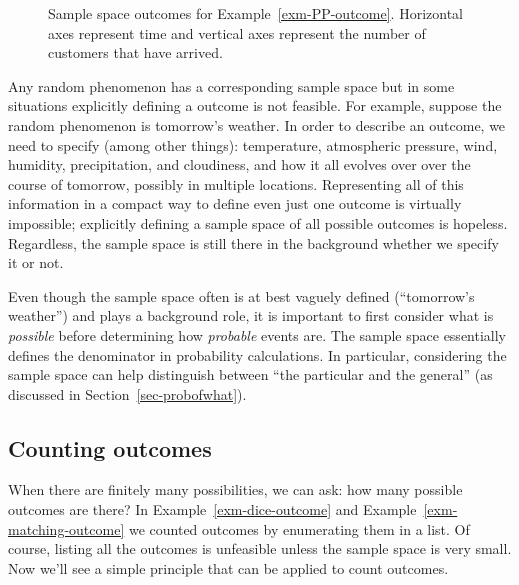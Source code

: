 \documentclass[
  letterpaper,
  DIV=11,
  numbers=noendperiod]{scrreprt}
\theoremstyle{plain}
\theoremstyle{definition}
\theoremstyle{definition}
\theoremstyle{definition}
\theoremstyle{remark}
\begin{document}
\begin{figure}
\begin{minipage}{0.33\linewidth}
{}


\end{minipage}%

\caption{\label{fig-PP-outcome}Sample space outcomes for
Example~\ref{exm-PP-outcome}. Horizontal axes represent time and
vertical axes represent the number of customers that have arrived.}

\end{figure}%

Any random phenomenon has a corresponding sample space but in some
situations explicitly defining a outcome is not feasible. For example,
suppose the random phenomenon is tomorrow's weather. In order to
describe an outcome, we need to specify (among other things):
temperature, atmospheric pressure, wind, humidity, precipitation, and
cloudiness, and how it all evolves over over the course of tomorrow,
possibly in multiple locations. Representing all of this information in
a compact way to define even just one outcome is virtually impossible;
explicitly defining a sample space of all possible outcomes is hopeless.
Regardless, the sample space is still there in the background whether we
specify it or not.

Even though the sample space often is at best vaguely defined
(``tomorrow's weather'') and plays a background role, it is important to
first consider what is \emph{possible} before determining how
\emph{probable} events are. The sample space essentially defines the
denominator in probability calculations. In particular, considering the
sample space can help distinguish between ``the particular and the
general'' (as discussed in Section~\ref{sec-probofwhat}).

\subsection{Counting outcomes}\label{counting-outcomes}

When there are finitely many possibilities, we can ask: how many
possible outcomes are there? In Example~\ref{exm-dice-outcome} and
Example~\ref{exm-matching-outcome} we counted outcomes by enumerating
them in a list. Of course, listing all the outcomes is unfeasible unless
the sample space is very small. Now we'll see a simple principle that
can be applied to count outcomes.
\end{document}
